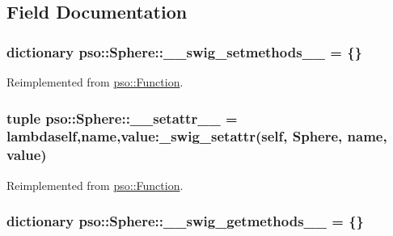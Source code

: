 \subsection{Field Documentation}
\hypertarget{classpso_1_1Sphere_9c2b9a1bd59f55c2010cbceda68c5916}{
\subsubsection{\setlength{\rightskip}{0pt plus 5cm}dictionary {\bf pso::Sphere::\_\-\_\-swig\_\-setmethods\_\-\_\-} = \{\}}}
\label{classpso_1_1Sphere_9c2b9a1bd59f55c2010cbceda68c5916}




Reimplemented from \hyperlink{classpso_1_1Function_2334bfe507115d58047f67960dde71d3}{pso::Function}.\hypertarget{classpso_1_1Sphere_303c4331c24184d721f1284e405b7453}{
\subsubsection{\setlength{\rightskip}{0pt plus 5cm}tuple {\bf pso::Sphere::\_\-\_\-setattr\_\-\_\-} = lambdaself,name,value:\_\-swig\_\-setattr(self, {\bf Sphere}, name, value)}}
\label{classpso_1_1Sphere_303c4331c24184d721f1284e405b7453}




Reimplemented from \hyperlink{classpso_1_1Function_cd8775cf6aadc3fdf4e6d82158ef10fb}{pso::Function}.\hypertarget{classpso_1_1Sphere_0c0cc3d04e98d1dc9576e1bdf5fa34ed}{
\subsubsection{\setlength{\rightskip}{0pt plus 5cm}dictionary {\bf pso::Sphere::\_\-\_\-swig\_\-getmethods\_\-\_\-} = \{\}}}
\label{classpso_1_1Sphere_0c0cc3d04e98d1dc9576e1bdf5fa34ed}




